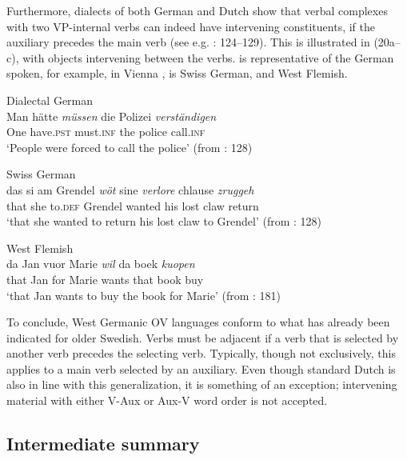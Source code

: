 \documentclass[output=paper, colorlinks, citecolor=brown]{langscibook}
\begin{document}
Furthermore, dialects of both German and Dutch show that verbal complexes with two VP-internal verbs can indeed have intervening constituents, if the auxiliary precedes the main verb (see e.g. \citealt{Sapp2011}: 124–129). This is illustrated in (20a–c), with objects intervening between the verbs.  is representative of the German spoken, for example, in Vienna \citep[128]{Haider2013},  is Swiss German, and  West Flemish.


\ea 
\label{ex:sangfelt:20}
\ea Dialectal German\label{ex:sangfelt:20a}\\
\gll Man hätte \textit{müssen} {die} {Polizei} \textit{verständigen} \\
 One have.\textsc{pst} must.\textsc{inf} the police call.\textsc{inf} \\
\glt ‘People were forced to call the police’ (from \citealt{Haider2013}: 128)

\ex Swiss German\label{ex:sangfelt:20b}\\
\gll das si am Grendel \textit{wöt} {sine} {\textit{verlore}} {chlause} \textit{zruggeh}\\
 that she to.\textsc{def} Grendel wanted his lost claw return \\
\glt ‘that she wanted to return his lost claw to Grendel’ (from \citealt{Haider2013}: 128)

\ex West Flemish\label{ex:sangfelt:20c}\\
\gll da Jan vuor Marie \textit{wil} {da} {boek} \textit{kuopen} \\
 that Jan for Marie wants that book buy \\
\glt ‘that Jan wants to buy the book for Marie’ (from \citealt{Haegeman1992}: 181)\\
\z
\z

To conclude, West Germanic OV languages conform to what has already been indicated for older Swedish. Verbs must be adjacent if a verb that is selected by another verb precedes the selecting verb. Typically, though not exclusively, this applies to a main verb selected by an auxiliary. Even though standard Dutch is also in line with this generalization, it is something of an exception; intervening material with either V-Aux or Aux-V word order is not accepted.

\subsection{Intermediate summary}\label{sec:sangfelt:3.4}
\end{document}
